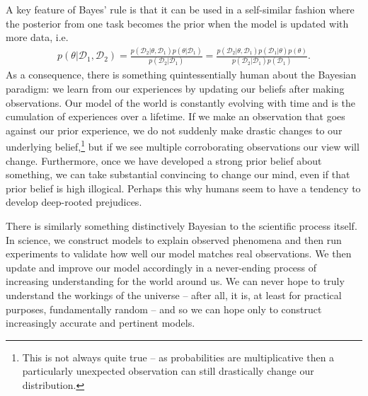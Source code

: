 A key feature of Bayes' rule is that it can be used in a self-similar fashion where the posterior from
one task becomes the prior when the model is updated with more data, i.e.
\begin{align}
	\label{eq:bayes:repeat-bayes}
p(\theta | \mathcal{D}_1, \mathcal{D}_2) = 
\frac{p(\mathcal{D}_2 | \theta, \mathcal{D}_1)p(\theta | \mathcal{D}_1)}{p(\mathcal{D}_2 | \mathcal{D}_1)} =
\frac{p(\mathcal{D}_2 | \theta, \mathcal{D}_1)p(\mathcal{D}_1 | \theta) p(\theta)}
{p(\mathcal{D}_2 | \mathcal{D}_1) p(\mathcal{D}_1)} .
\end{align}
As a consequence, there is something quintessentially human about the Bayesian paradigm: we learn
from our experiences by updating our beliefs after making observations.  Our model of the world
is constantly evolving with time and is the cumulation of experiences over a lifetime.  
If we make an observation that goes against our prior experience, we do not suddenly make
drastic changes to our underlying belief,\footnote{This is not always quite true --
	as probabilities are multiplicative then a particularly unexpected
	observation can still drastically change our distribution.}
 but if we see multiple corroborating observations our
view will change.
Furthermore, once we have developed
a strong prior belief about something, we can take substantial convincing to change our mind, even
if that prior belief is high illogical.  Perhaps this why humans seem to have a tendency to develop
deep-rooted prejudices.

There is similarly something distinctively Bayesian to the scientific process itself.  In science, we construct models
to explain observed phenomena and then run experiments to validate how well our model matches
real observations.  We then update and improve our model accordingly in a never-ending process of
increasing understanding for the world around us.  We can never hope to truly understand the workings
of the universe  -- after all, it is, at least for practical purposes, fundamentally random
-- and so we can hope only to construct increasingly accurate and pertinent models.


